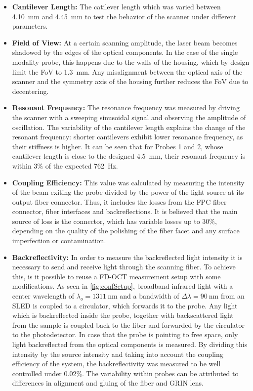 \begin{itemize}


\item \textbf{Cantilever Length:} The catilever length which was varied between \SI{4.10}{\milli\meter} and \SI{4.45}{\milli\meter} to test the behavior of the scanner under different parameters. 

\item \textbf{Field of View:} At a certain scanning amplitude, the laser beam becomes shadowed by the edges of the optical components. In the case of the single modality probe, this happens due to the walls of the housing, which by design limit the FoV to \SI{1.3}{\milli\meter}. Any misalignment between the optical axis of the scanner and the symmetry axis of the housing further reduces the FoV due to decentering.

\item \textbf{Resonant Frequency:} The resonance frequency was measured by driving the scanner with a sweeping sinusoidal signal and observing the amplitude of oscillation. The variability of the cantilever length explains the change of the resonant frequency: shorter cantilevers exhibit lower resonance frequency, as their stiffness is higher. It can be seen that for Probes 1 and 2, whose cantilever length is close to the designed \SI{4.5}{\milli\meter}, their resonant frequency is within 3\% of the expected \SI{762}{\hertz}. 

\item \textbf{Coupling Efficiency:} This value was calculated by measuring the intensity of the beam exiting the probe divided by the power of the light source at its output fiber connector. Thus, it includes the losses from the FPC fiber connector, fiber interfaces and backreflections. It is believed that the main source of loss is the connector, which has variable losses up to 30\%, depending on the quality of the polishing of the fiber facet and any surface imperfection or contamination. 

\item \textbf{Backreflectivity:} In order to measure the backreflected light intensity it is necessary to send and receive light through the scanning fiber. To achieve this, is it possible to reuse a FD-OCT measurement setup with some modifications. As seen in \autoref{fig:confSetup}, broadband infrared light with a center wavelength of $\lambda_o = \SI{1311}{\nano\meter}$ and a bandwidth of $\Delta \lambda = \SI{90}{\nano\meter} $ from an SLED is coupled to a circulator, which forwards it to the probe. Any light which is backreflected inside the probe, together with backscattered light from the sample is coupled back to the fiber and forwarded by the circulator to the photodetector. In case that the probe is pointing to free space, only light backreflected from the optical components is measured. By dividing this intensity by the source intensity and taking into account the coupling efficiency of the system, the backreflectivity was measured to be well controlled under 0.02\%. The variability within probes can be attributed to differences in alignment and gluing of the fiber and GRIN lens.

\end{itemize}

